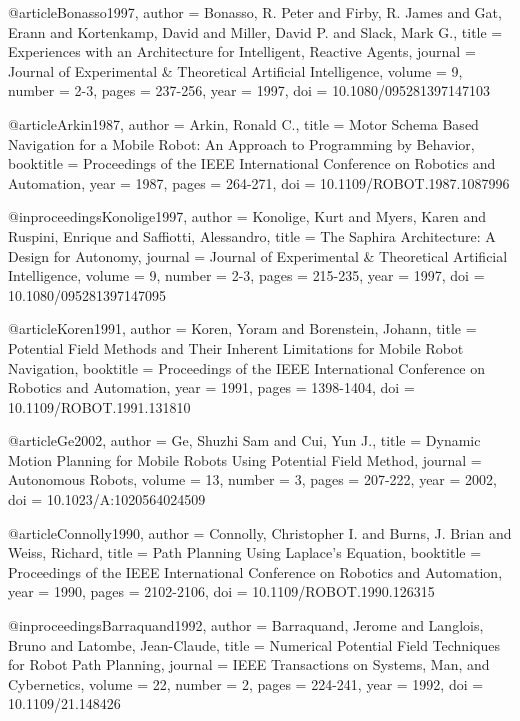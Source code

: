 @article{Bonasso1997,
  author = {Bonasso, R. Peter and Firby, R. James and Gat, Erann and Kortenkamp, David and Miller, David P. and Slack, Mark G.},
  title = {Experiences with an Architecture for Intelligent, Reactive Agents},
  journal = {Journal of Experimental \& Theoretical Artificial Intelligence},
  volume = {9},
  number = {2-3},
  pages = {237-256},
  year = {1997},
  doi = {10.1080/095281397147103}
}

@article{Arkin1987,
  author = {Arkin, Ronald C.},
  title = {Motor Schema Based Navigation for a Mobile Robot: An Approach to Programming by Behavior},
  booktitle = {Proceedings of the IEEE International Conference on Robotics and Automation},
  year = {1987},
  pages = {264-271},
  doi = {10.1109/ROBOT.1987.1087996}
}

@inproceedings{Konolige1997,
  author = {Konolige, Kurt and Myers, Karen and Ruspini, Enrique and Saffiotti, Alessandro},
  title = {The Saphira Architecture: A Design for Autonomy},
  journal = {Journal of Experimental \& Theoretical Artificial Intelligence},
  volume = {9},
  number = {2-3},
  pages = {215-235},
  year = {1997},
  doi = {10.1080/095281397147095}
}

@article{Koren1991,
  author = {Koren, Yoram and Borenstein, Johann},
  title = {Potential Field Methods and Their Inherent Limitations for Mobile Robot Navigation},
  booktitle = {Proceedings of the IEEE International Conference on Robotics and Automation},
  year = {1991},
  pages = {1398-1404},
  doi = {10.1109/ROBOT.1991.131810}
}

@article{Ge2002,
  author = {Ge, Shuzhi Sam and Cui, Yun J.},
  title = {Dynamic Motion Planning for Mobile Robots Using Potential Field Method},
  journal = {Autonomous Robots},
  volume = {13},
  number = {3},
  pages = {207-222},
  year = {2002},
  doi = {10.1023/A:1020564024509}
}

@article{Connolly1990,
  author = {Connolly, Christopher I. and Burns, J. Brian and Weiss, Richard},
  title = {Path Planning Using Laplace's Equation},
  booktitle = {Proceedings of the IEEE International Conference on Robotics and Automation},
  year = {1990},
  pages = {2102-2106},
  doi = {10.1109/ROBOT.1990.126315}
}

@inproceedings{Barraquand1992,
  author = {Barraquand, Jerome and Langlois, Bruno and Latombe, Jean-Claude},
  title = {Numerical Potential Field Techniques for Robot Path Planning},
  journal = {IEEE Transactions on Systems, Man, and Cybernetics},
  volume = {22},
  number = {2},
  pages = {224-241},
  year = {1992},
  doi = {10.1109/21.148426}
}

